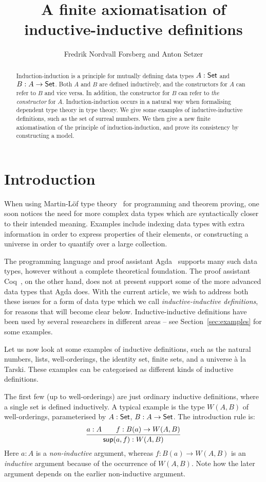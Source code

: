 \documentclass{schwicht}
\title{A finite axiomatisation of inductive-inductive definitions}
\author{Fredrik Nordvall Forsberg and Anton Setzer}
\begin{document}
\altmaketitle

\begin{abstract}
  \noindent 
  Induction-induction is a principle for mutually defining data types
  $A : \mathsf{Set}$ and $B : A \to \mathsf{Set}$. Both $A$ and $B$ are defined
  inductively, and the constructors for $A$ can refer to $B$ and vice
  versa. In addition, the constructor for $B$ can refer to \emph{the
    constructor} for $A$. Induction-induction occurs in a natural way
  when formalising dependent type theory in type theory.  We give some
  examples of inductive-inductive definitions, such as the set of
  surreal numbers. We then give a new finite axiomatisation of the
  principle of induction-induction, and prove its consistency by
  constructing a model.
\end{abstract}

\section{Introduction}
\label{sec:introduction}

When using Martin-L\"of type theory~\cite{martinlof1984bibliopolis}
for programming and theorem proving, one soon notices the need for
more complex data types which are syntactically closer to their intended
meaning. Examples include indexing data types with extra information
in order to express properties of their elements, or constructing a
universe in order to quantify over a large collection.

The programming language and proof assistant
Agda~\cite{norell2007thesis} supports many such data types, however
without a complete theoretical foundation. The proof assistant
Coq~\cite{coq}, on the other hand, does not at present support some of
the more advanced data types that Agda does. With the current article,
we wish to address both these issues for a form of data type which we
call \emph{inductive-inductive definitions}, for reasons that will
become clear below. Inductive-inductive definitions have been used by
several researchers in different areas -- see
Section~\ref{sec:examples} for some examples.

Let us now look at some examples of inductive definitions, such as the
natural numbers, lists, well-orderings, the identity set, finite sets,
and a universe \`a la Tarski. These examples can be categorised as
different kinds of inductive definitions.

The first few (up to well-orderings) are just ordinary inductive
definitions, where a single set is defined inductively. A typical
example is the type $W(A, B)$ of well-orderings, parameterised by $A :
\mathsf{Set}$, $B : A \to \mathsf{Set}$. The introduction rule is:
\[
\infer{\Wsup(a, f) : W(A, B)}{a : A & \quad f : B(a) \to W(A, B)}
\]
Here $a : A$ is a \emph{non-inductive} argument, whereas $f : B(a) \to
W(A, B)$ is an \emph{inductive} argument because of the occurrence of
$W(A, B)$. Note how the later argument depends on the earlier
non-inductive argument.
\end{document}
